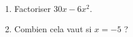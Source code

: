 
\begin{exercice}\label{exo2smath-0133}

    \begin{enumerate}
        \item
    Factoriser \( 30x-6x^2\). 
\item
    Combien cela vaut si \( x=-5\) ?
    \end{enumerate}

\end{exercice}
